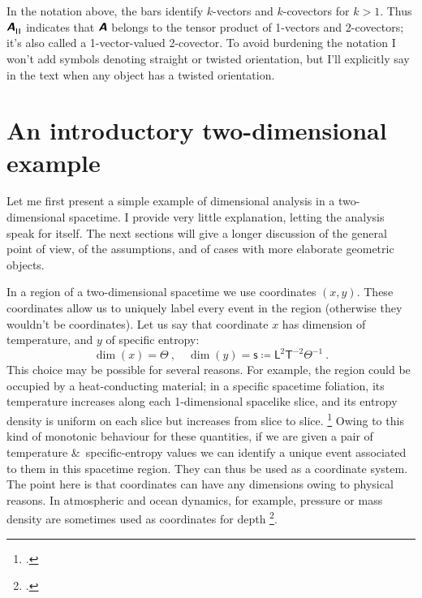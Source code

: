 \documentclass[\ifafour a4paper,12pt,\else a5paper,10pt,\fi%
onecolumn,oneside,article,%
british%
]{memoir}
\makeatletter
\theoremstyle{remark}
\theoremstyle{innote}
\newcommand*{\mathte}[1]{\textbf{\textit{\textsf{#1}}}}
\newcommand*{\citep}{\footcites}
\newcommand*{\amp}{\&}
\newcommand*{\defd}{\coloneqq}
\renewcommand*{\|}[1][]{\nonscript\,#1\vert\nonscript\;\mathopen{}}
\newcommand*{\sect}{\S}%
\newcommand*{\chap}{ch.}%
\newcommand*{\eg}{{e.g.}}
\newcommand*{\q}{}%
\DeclareRobustCommand*{\q}{%
  \mathord{\mathpalette\bigcdot@{}}%
}
\newcommand*{\bigcdot@scalefactor}{0.7}
\newcommand*{\bigcdot@widthfactor}{1.5}
\newcommand*{\bigcdot@}[2]{%
  \sbox0{$#1\vcenter{}$}%
  \sbox2{$#1\cdot\m@th$}%
  \hbox to \bigcdot@widthfactor\wd2{%
    \hfil
    \raise\ht0\hbox{%
      \scalebox{\bigcdot@scalefactor}{%
        \lower\ht0\hbox{$#1\bullet\m@th$}%
      }%
    }%
    \hfil
  }%
}
\newcommand*{\Le}{\textsf{L}}
\newcommand*{\Ti}{\textsf{T}}
\newcommand*{\Te}{\Theta}
\newcommand*{\Ent}{\textsf{s}}
\newcommand*{\yA}{\mathte{A}}
\renewcommand*{\i}{\indices}
\newcommand*{\rul}{{\mkern2mu\rule[-0.1ex]{0.75pt}{1.1ex}\mkern2mu}}
\DeclarePairedDelimiter\mul{\rul}{\rul}%
\makeatother
\begin{document}
In the notation above, the bars identify $k$-vectors and $k$-covectors for
$k>1$. Thus $\yA\i{^{\q}_{\mul{\q\q}}}$ indicates that $\yA$ belongs to the
tensor product of 1-vectors and 2-covectors; it's also called a
1-vector-valued 2-covector. To avoid burdening the notation I won't add
symbols denoting straight or twisted orientation, but I'll explicitly say
in the text when any object has a twisted orientation.










\section{An introductory two-dimensional example}
\label{sec:2d_example}

Let me first present a simple example of dimensional analysis in a
two-dimensional spacetime. I provide very little explanation, letting the
analysis speak for itself. The next sections will give a longer discussion
of the general point of view, of the assumptions, and of cases with more
elaborate geometric objects.

In a region of a two-dimensional spacetime we use coordinates $(x,y)$.
These coordinates allow us to uniquely label every event in the region
(otherwise they wouldn't be coordinates). Let us say that coordinate $x$
has dimension of temperature, and $y$ of specific entropy:
\begin{equation}
  \label{eq:example_coords2d}
  \dim(x)=\Te \ ,\quad
  \dim(y)= \Ent \defd \Le^{2}\Ti^{-2}\Te^{-1} \ .
\end{equation}
This choice may be possible for several reasons. For example, the region
could be occupied by a heat-conducting material; in a specific spacetime
foliation, its temperature increases along each 1-dimensional spacelike
slice, and its entropy density is uniform on each slice but increases from
slice to slice. \citep[For general-relativistic thermomechanics see
\eg][]{eckart1940c,maugin1974b,maugin1978b,maugin1978c,maugin1978d,maugin1978e,muschiketal2014}
Owing to this kind of monotonic behaviour for these quantities, if we are
given a pair of temperature \amp\ specific-entropy values we can identify a
unique event associated to them in this spacetime region. They can thus be
used as a coordinate system. The point here is that coordinates can have
any dimensions owing to physical reasons. In atmospheric and ocean
dynamics, for example, pressure or mass density are sometimes used as
coordinates for depth
\citep[\chap~6]{griffies2004}[\sect~2.6.2]{vallis2006}.
\end{document}
